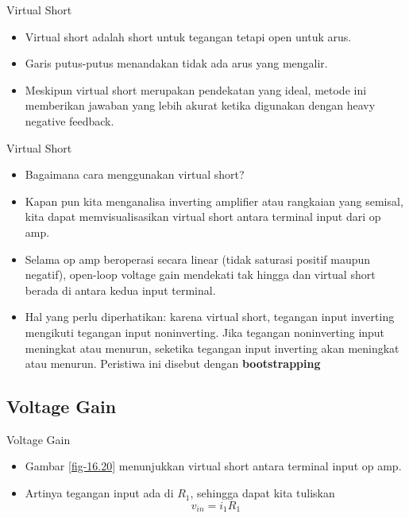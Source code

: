 \begin{frame}{Virtual Short}
	\begin{itemize}
		\item Virtual short adalah short untuk tegangan tetapi open untuk arus.
		\item Garis putus-putus menandakan tidak ada arus yang mengalir.
		\item Meskipun virtual short merupakan pendekatan yang ideal, metode ini memberikan jawaban yang lebih akurat ketika digunakan dengan heavy negative feedback.
	\end{itemize}
\end{frame}

\begin{frame}{Virtual Short}
	\begin{itemize}
		\item Bagaimana cara menggunakan virtual short?
		\item Kapan pun kita menganalisa inverting amplifier atau rangkaian yang semisal, kita dapat memvisualisasikan virtual short antara terminal input dari op amp.
		\item Selama op amp beroperasi secara linear (tidak saturasi positif maupun negatif), open-loop voltage gain mendekati tak hingga dan virtual short berada di antara kedua input terminal.
		\item Hal yang perlu diperhatikan: karena virtual short, tegangan input inverting mengikuti tegangan input noninverting. Jika tegangan noninverting input meningkat atau menurun, seketika tegangan input inverting akan meningkat atau menurun. Peristiwa ini disebut dengan \textbf{bootstrapping}
	\end{itemize}
\end{frame}



\subsection{Voltage Gain}

\begin{frame}{Voltage Gain}
	\begin{itemize}
		\item Gambar \ref{fig-16.20} menunjukkan virtual short antara terminal input op amp.
		\item Artinya tegangan input ada di $ R_1 $, sehingga dapat kita tuliskan\\
		\[ v_{in} = i_1 R_1 \]
	\end{itemize}
\end{frame}

